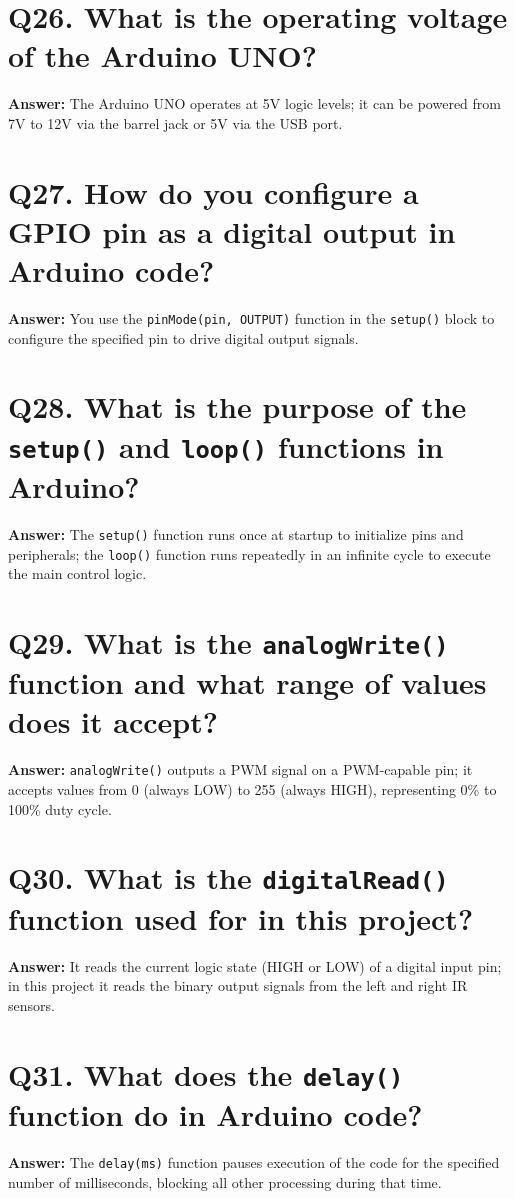 \documentclass[12pt,a4paper,oneside]{report}
\begin{document}
\section{Q26. What is the operating voltage of the Arduino UNO?}
\textbf{Answer:} The Arduino UNO operates at 5V logic levels; it can be powered from 7V to 12V via the barrel jack or 5V via the USB port.

\section{Q27. How do you configure a GPIO pin as a digital output in Arduino code?}
\textbf{Answer:} You use the \texttt{pinMode(pin, OUTPUT)} function in the \texttt{setup()} block to configure the specified pin to drive digital output signals.

\section{Q28. What is the purpose of the \texttt{setup()} and \texttt{loop()} functions in Arduino?}
\textbf{Answer:} The \texttt{setup()} function runs once at startup to initialize pins and peripherals; the \texttt{loop()} function runs repeatedly in an infinite cycle to execute the main control logic.

\section{Q29. What is the \texttt{analogWrite()} function and what range of values does it accept?}
\textbf{Answer:} \texttt{analogWrite()} outputs a PWM signal on a PWM-capable pin; it accepts values from 0 (always LOW) to 255 (always HIGH), representing 0\% to 100\% duty cycle.

\section{Q30. What is the \texttt{digitalRead()} function used for in this project?}
\textbf{Answer:} It reads the current logic state (HIGH or LOW) of a digital input pin; in this project it reads the binary output signals from the left and right IR sensors.

\section{Q31. What does the \texttt{delay()} function do in Arduino code?}
\textbf{Answer:} The \texttt{delay(ms)} function pauses execution of the code for the specified number of milliseconds, blocking all other processing during that time.
\end{document}
